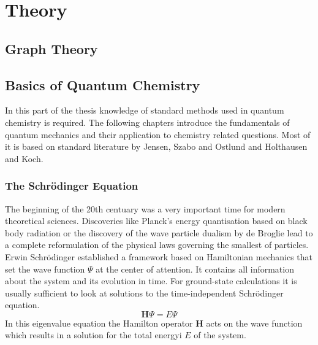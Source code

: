
\part{Theory}
\label{sec:theory}

\chapter{Graph Theory}
\label{sec:graphtheory}

\chapter{Basics of Quantum Chemistry}
\label{sec:basicsofQC}

In this part of the thesis knowledge of standard methods used in quantum
chemistry is required. The following chapters introduce the fundamentals of
quantum mechanics and their application to chemistry related questions. Most of
it is based on standard literature by
Jensen\autocite{Jensen_IntroductionComputationalChemistry_2007}, Szabo and
Ostlund\autocite{Szabo_ModernQuantumChemistry_1996} and Holthausen and
Koch\autocite{Koch_ChemistGuideDensity_2001}.

\section{The Schr\"odinger Equation}
\label{sec:schrodingerequation}

The beginning of the 20th centuary was a very important time for modern
theoretical sciences. Discoveries like Planck's energy quantisation based on
black body radiation or the discovery of the wave particle dualism by de
Broglie lead to a complete reformulation of the physical laws governing the
smallest of particles. Erwin Schr\"odinger established a framework based on
Hamiltonian mechanics that set the wave function $\Psi$ at the center of
attention. It contains all information about the system and its evolution in
time. For ground-state calculations it is usually sufficient to look at
solutions to the time-independent Schr\"odinger equation.%
%
\begin{equation}
	\mathbf{H}\Psi=E\Psi\label{eqn:SchrodingerEquation}
\end{equation}%
%
In this eigenvalue equation the Hamilton operator $\mathbf{H}$ acts on the wave
function which results in a solution for the total energyi $E$ of the system. 


